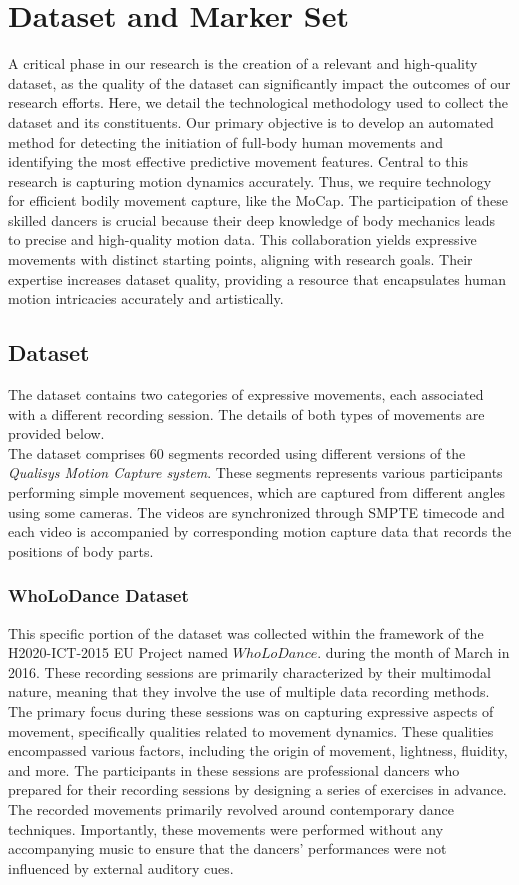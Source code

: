 \chapter{Dataset and Marker Set}
A critical phase in our research is the creation of a relevant and high-quality dataset, 
as the quality of the dataset can significantly impact the outcomes of our research efforts.
Here, we detail the technological methodology used to collect the dataset and its constituents.
Our primary objective is to develop an automated method for detecting the initiation of full-body human movements and identifying the most effective predictive movement features.
Central to this research is capturing motion dynamics accurately.
Thus, we require technology for efficient bodily movement capture, like the MoCap.
The participation of these skilled dancers is crucial because their deep knowledge of body mechanics leads to precise and high-quality motion data.
This collaboration yields expressive movements with distinct starting points, aligning with research goals.
Their expertise increases dataset quality, providing a resource that encapsulates human motion intricacies accurately and artistically.


\section{Dataset}
The dataset contains two categories of expressive movements, each associated with a different recording session.
The details of both types of movements are provided below.\\
The dataset comprises 60 segments recorded using different versions of the \textit{Qualisys Motion Capture system}.
These segments represents various participants performing simple movement sequences, which are captured from different angles using some cameras.
The videos are synchronized through SMPTE timecode and each video is accompanied by corresponding motion capture data that records the positions of body parts.


\subsection{WhoLoDance Dataset}
This specific portion of the dataset was collected within the framework of the H2020-ICT-2015 EU Project named $WhoLoDance$.
during the month of March in 2016.
These recording sessions are primarily characterized by their multimodal nature, 
meaning that they involve the use of multiple data recording methods. 
The primary focus during these sessions was on capturing expressive aspects of movement, 
specifically qualities related to movement dynamics. These qualities encompassed various factors, 
including the origin of movement, lightness, fluidity, and more.
The participants in these sessions are professional dancers 
who prepared for their recording sessions by designing a series of exercises in advance. 
The recorded movements primarily revolved around contemporary dance techniques. 
Importantly, these movements were performed without any accompanying music to ensure that 
the dancers' performances were not influenced by external auditory cues.


